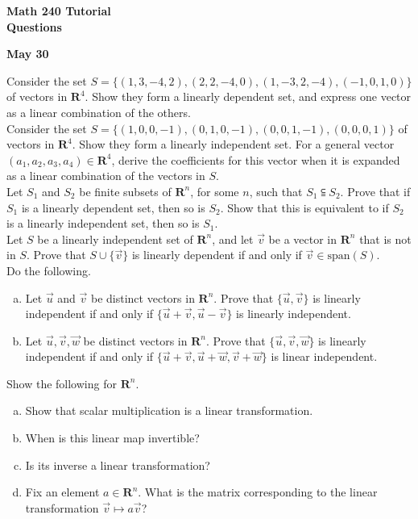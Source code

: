 \documentclass[a4paper,11pt]{article}
\newcommand{\R}{\mathbf{R}}
\begin{document}
\begin{center}
  {\Large\bfseries Math 240 Tutorial \\ Questions}
\end{center}
\begin{center}
  {\bfseries May 30}
\end{center}

 Consider the set
$S=\{(1,3,-4,2),(2,2,-4,0),(1,-3,2,-4),(-1,0,1,0)\}$ of vectors in $\R^4$. Show
they form a linearly dependent set, and express one vector as a linear combination
of the others. \\

 Consider the set
$S=\{(1,0,0,-1),(0,1,0,-1),(0,0,1,-1),(0,0,0,1)\}$ of vectors in $\R^4$. Show
they form a linearly independent set. For a general vector $(a_1,a_2,a_3,a_4)
\in \R^4$, derive the coefficients for this vector when it is expanded as a
linear combination of the vectors in $S$. \\

 Let $S_1$ and $S_2$ be finite subsets of $\R^n$,
for some $n$, such that $S_1 \subseteqq S_2$. Prove that if $S_1$ is a linearly
dependent set, then so is $S_2$. Show that this is equivalent to if $S_2$ is a
linearly independent set, then so is $S_1$. \\

 Let $S$ be a linearly independent set of $\R^n$,
and let $\vec v$ be a vector in $\R^n$ that is not in $S$. Prove that $S \cup
\{\vec v\}$ is linearly dependent if and only if $\vec v \in \text{span}(S)$. \\

 Do the following.
\begin{enumerate}[(a)]
\item Let $\vec u$ and $\vec v$ be distinct vectors in $\R^n$. Prove that
  $\{\vec u, \vec v\}$ is linearly independent if and only if $\{\vec u + \vec v,
  \vec u - \vec v\}$ is linearly independent.
\item Let $\vec u, \vec v, \vec w$ be distinct vectors in $\R^n$. Prove that
  $\{\vec u, \vec v, \vec w\}$ is linearly independent if and only if $\{\vec
  u+\vec v,\vec u+\vec w,\vec v+\vec w\}$ is linear independent. \\
\end{enumerate}

 Show the following for $\R^n$.
\begin{enumerate}[(a)]
\item Show that scalar multiplication is a linear transformation.
\item When is this linear map invertible?
\item Is its inverse a linear transformation?
\item Fix an element $a \in \R^n$. What is the matrix corresponding to the
linear transformation $\vec v \mapsto a\vec v$? \\
\end{enumerate}
\end{document}
